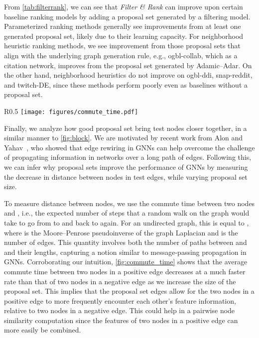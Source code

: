 \documentclass{article}
\begin{document}
From \cref{tab:filterrank}, we can see that \textit{Filter \& Rank} can improve upon certain baseline ranking models by adding a proposal set generated by a filtering model. 
Parameterized ranking methods generally see improvements from at least one generated proposal set, likely due to their learning capacity.
For neighborhood heuristic ranking methods, we see improvement from those proposal sets that align with the underlying graph generation rule, e.g., ogbl-collab, which as a citation network, improves from the proposal set generated by Adamic--Adar.
On the other hand, neighborhood heuristics do not improve on ogbl-ddi, snap-reddit, and twitch-DE, since these methods perform poorly even as baselines without a proposal set. 


\begin{wrapfigure}[19]{R}{0.5\linewidth}
    \centering
    \texttt{[image: figures/commute\_time.pdf]}
    \vspace{-7mm}
    \caption{Percentage change in average commute time as the size of generated proposal sets vary. The solid lines correspond to the decrease in commute time of positive edges, and the dotted lines to that of negative edges.}
    \label{fig:commute_time}
\end{wrapfigure}
Finally, we analyze how good proposal set bring test nodes closer together, in a similar manner to \cref{fig:block}.
We are motivated by recent work from Alon and Yahav~\cite{Alon2020OnTB}, 
who showed that edge rewiring in GNNs can help overcome the challenge of propagating information in networks over a long path of edges. 
Following this, we can infer why proposal sets improve the performance of GNNs by measuring the 
decrease in distance between nodes in test edges, while varying proposal set size.

To measure distance between nodes, we use the commute time between two nodes  and , i.e., 
the expected number of steps that a random walk on the graph would take to go from  to  and back to  again.
For an undirected graph, this is equal to 
, where  is the Moore--Penrose pseudoinverse of the graph Laplacian  and  is the number of edges.
This quantity involves both the number of paths between  and  and their lengths, capturing a notion similar to message-passing propagation in GNNs. Corroborating our intuition, \cref{fig:commute_time} shows that the average commute time between two nodes in a positive edge decreases at a much faster rate than that of two nodes in a negative edge as we increase the size of the proposal set.
This implies that the proposal set edges allow for the two nodes in a positive edge to more frequently encounter each other's feature information, relative to two nodes in a negative edge.
This could help in a pairwise node similarity computation since the features of two nodes in a positive edge can more easily be combined.
\end{document}
